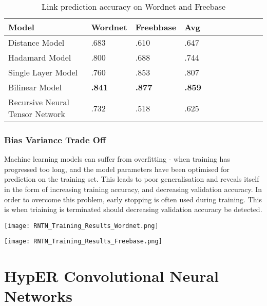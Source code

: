 \begin{table}[H]
\caption{Link prediction accuracy on Wordnet and Freebase}
\centering
\begin{tabular}{lllllllllll}
  \textbf{Model} & \textbf{Wordnet} & \textbf{Freebbase} & \textbf{Avg} \\
  \hline
  Distance Model & .683 & .610 & .647 \\
  Hadamard Model & .800 & .688 & .744 \\
  Single Layer Model & .760 & .853 & .807 \\
  Bilinear Model & \textbf{.841} & \textbf{.877} & \textbf{.859} \\
  Recursive Neural Tensor Network & .732 & .518 & .625 \\

\end{tabular}
\end{table}

\subsubsection{Bias Variance Trade Off}
Machine learning models can suffer from overfitting \cite{reference} - when training has progressed too long, and the model parameters have been optimised for prediction on the training set. This leads to poor generalisation  and reveals itself in the form of increasing training accuracy, and decreasing validation accuracy. In order to overcome this problem, early stopping is often used during training. This is when triaining is terminated should decreasing validation accuracy be detected.\newline

\begin{center}
    \texttt{[image: RNTN\_Training\_Results\_Wordnet.png]}
\end{center}

\begin{center}
    \texttt{[image: RNTN\_Training\_Results\_Freebase.png]}
\end{center}

\section{HypER Convolutional Neural Networks}


